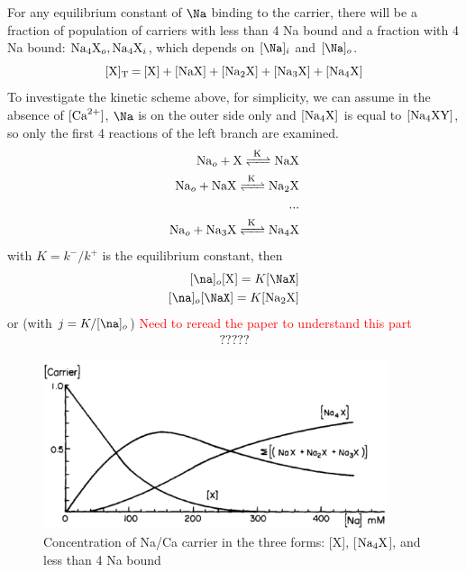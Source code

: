 For any equilibrium constant of $\Na$ binding to the carrier, there
will be a fraction of population of carriers with less than 4 Na bound
and a fraction with 4 Na bound: $\ce{Na4X_o}, \ce{Na4X_i}$, which
depends on $[\Na]_i$ and $[\Na]_o$. 
\begin{equation}
  \label{eq:1163}
  \ce{[X]_T = [X] + [NaX] + [Na2X] + [Na3X] + [Na4X]}
\end{equation}
To investigate the kinetic scheme above, for simplicity, we can assume
in the absence of $[{\text{Ca}^{2+}}]$, $\Na$ is on the outer side only and
$[\ce{Na4X}]$ is equal to $[\ce{Na4XY}]$, so only the first 4
reactions of the left branch are examined.
  \begin{equation}
    \label{eq:1165}
    \begin{split}
      \ce{Na_o + X <=>[K] NaX} \\
      \ce{Na_o + NaX <=>[K] Na2X}  \\
      ... \\
      \ce{Na_o + Na3X <=>[K] Na4X}  \\
    \end{split}
  \end{equation}
with $K=k^-/k^+$ is the equilibrium constant, then 
\begin{equation}
  \label{eq:1166}
  \begin{split}
    [\na]_o[\ce{X}] = K[\NaX] \\
    [\na]_o[\NaX] = K[\ce{Na2X}] \\
  \end{split}
\end{equation}
or (with $j=K/[\na]_o$) \textcolor{red}{Need to reread the paper to
  understand this part}
\begin{equation}
  \label{eq:1167}
  \begin{split}
    ?????
  \end{split}
\end{equation}

\begin{figure}[hbt]
  \centerline{\includegraphics[height=5cm,
    angle=0]{./images/Mullins_carrier.eps}}
\caption{Concentration of Na/Ca carrier in the three forms: [X],
  [$\ce{Na4X}$], and less than 4 Na bound }
\label{fig:Mullins_carrier}
\end{figure}


